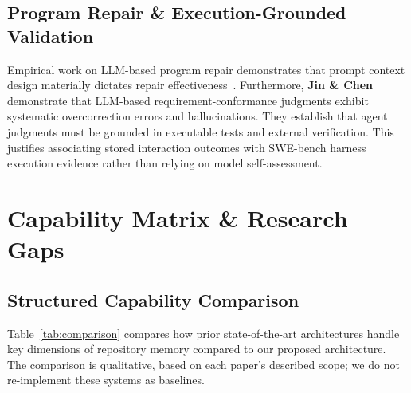 \documentclass[conference]{IEEEtran}
\begin{document}
\subsection{Program Repair \& Execution-Grounded Validation}
Empirical work on LLM-based program repair demonstrates that prompt context design materially dictates repair effectiveness~\cite{cao2025programrepair}. Furthermore, \textbf{Jin \& Chen}~\cite{jin2026codereview} demonstrate that LLM-based requirement-conformance judgments exhibit systematic overcorrection errors and hallucinations. They establish that agent judgments must be grounded in executable tests and external verification. This justifies associating stored interaction outcomes with SWE-bench harness execution evidence rather than relying on model self-assessment.

\section{Capability Matrix \& Research Gaps}

\subsection{Structured Capability Comparison}
Table~\ref{tab:comparison} compares how prior state-of-the-art architectures handle key dimensions of repository memory compared to our proposed architecture. The comparison is qualitative, based on each paper's described scope; we do not re-implement these systems as baselines.
\end{document}
